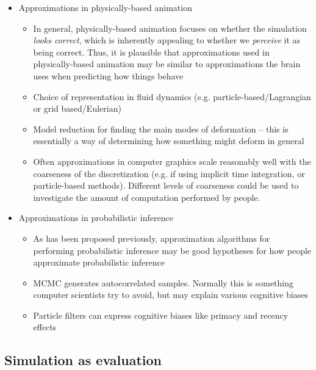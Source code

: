 \documentclass[12pt]{article}
\begin{document}
\begin{itemize}
\item Approximations in physically-based animation
    \begin{itemize}
    \item In general, physically-based animation focuses on whether the simulation \textit{looks correct}, which is inherently appealing to whether we \textit{perceive} it as being correct. Thus, it is plausible that approximations used in physically-based animation may be similar to approximations the brain uses when predicting how things behave
    \item Choice of representation in fluid dynamics (e.g. particle-based/Lagrangian or grid based/Eulerian) \citep{Witkin1997,Stam1999,Nealen2006}
    \item Model reduction for finding the main modes of deformation -- this is essentially a way of determining how something might deform in general \citep{Nealen2006}
    \item Often approximations in computer graphics scale reasonably well with the coarseness of the discretization (e.g. if using implicit time integration, or particle-based methods). Different levels of coarseness could be used to investigate the amount of computation performed by people. \citep{Griffiths2015}
    \end{itemize}

\item Approximations in probabilistic inference
    \begin{itemize}
    \item As has been proposed previously, approximation algorithms for performing probabilistic inference may be good hypotheses for how people approximate probabilistic inference \citep{Lieder2012,Griffiths2015}
    \item MCMC \citep{Chib1995} generates autocorrelated samples. Normally this is something computer scientists try to avoid, but may explain various cognitive biases \citep{Lieder2012}
    \item Particle filters can express cognitive biases like primacy and recency effects \citep{Abbott2011}
    \end{itemize}

\end{itemize}

\subsection*{Simulation as evaluation}
\end{document}
